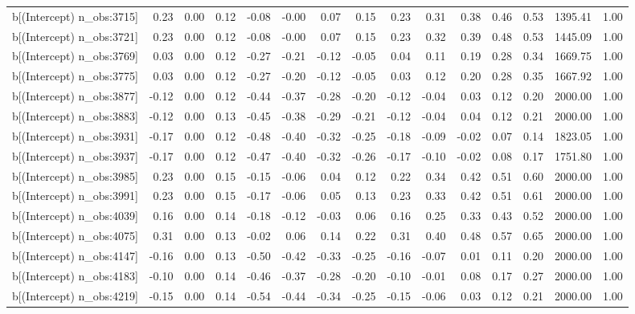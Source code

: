 \begin{table}[ht]
\begin{tabular}{rrrrrrrrrrrrrrr}
  b[(Intercept) n\_obs:3715] & 0.23 & 0.00 & 0.12 & -0.08 & -0.00 & 0.07 & 0.15 & 0.23 & 0.31 & 0.38 & 0.46 & 0.53 & 1395.41 & 1.00 \\ 
  b[(Intercept) n\_obs:3721] & 0.23 & 0.00 & 0.12 & -0.08 & -0.00 & 0.07 & 0.15 & 0.23 & 0.32 & 0.39 & 0.48 & 0.53 & 1445.09 & 1.00 \\ 
  b[(Intercept) n\_obs:3769] & 0.03 & 0.00 & 0.12 & -0.27 & -0.21 & -0.12 & -0.05 & 0.04 & 0.11 & 0.19 & 0.28 & 0.34 & 1669.75 & 1.00 \\ 
  b[(Intercept) n\_obs:3775] & 0.03 & 0.00 & 0.12 & -0.27 & -0.20 & -0.12 & -0.05 & 0.03 & 0.12 & 0.20 & 0.28 & 0.35 & 1667.92 & 1.00 \\ 
  b[(Intercept) n\_obs:3877] & -0.12 & 0.00 & 0.12 & -0.44 & -0.37 & -0.28 & -0.20 & -0.12 & -0.04 & 0.03 & 0.12 & 0.20 & 2000.00 & 1.00 \\ 
  b[(Intercept) n\_obs:3883] & -0.12 & 0.00 & 0.13 & -0.45 & -0.38 & -0.29 & -0.21 & -0.12 & -0.04 & 0.04 & 0.12 & 0.21 & 2000.00 & 1.00 \\ 
  b[(Intercept) n\_obs:3931] & -0.17 & 0.00 & 0.12 & -0.48 & -0.40 & -0.32 & -0.25 & -0.18 & -0.09 & -0.02 & 0.07 & 0.14 & 1823.05 & 1.00 \\ 
  b[(Intercept) n\_obs:3937] & -0.17 & 0.00 & 0.12 & -0.47 & -0.40 & -0.32 & -0.26 & -0.17 & -0.10 & -0.02 & 0.08 & 0.17 & 1751.80 & 1.00 \\ 
  b[(Intercept) n\_obs:3985] & 0.23 & 0.00 & 0.15 & -0.15 & -0.06 & 0.04 & 0.12 & 0.22 & 0.34 & 0.42 & 0.51 & 0.60 & 2000.00 & 1.00 \\ 
  b[(Intercept) n\_obs:3991] & 0.23 & 0.00 & 0.15 & -0.17 & -0.06 & 0.05 & 0.13 & 0.23 & 0.33 & 0.42 & 0.51 & 0.61 & 2000.00 & 1.00 \\ 
  b[(Intercept) n\_obs:4039] & 0.16 & 0.00 & 0.14 & -0.18 & -0.12 & -0.03 & 0.06 & 0.16 & 0.25 & 0.33 & 0.43 & 0.52 & 2000.00 & 1.00 \\ 
  b[(Intercept) n\_obs:4075] & 0.31 & 0.00 & 0.13 & -0.02 & 0.06 & 0.14 & 0.22 & 0.31 & 0.40 & 0.48 & 0.57 & 0.65 & 2000.00 & 1.00 \\ 
  b[(Intercept) n\_obs:4147] & -0.16 & 0.00 & 0.13 & -0.50 & -0.42 & -0.33 & -0.25 & -0.16 & -0.07 & 0.01 & 0.11 & 0.20 & 2000.00 & 1.00 \\ 
  b[(Intercept) n\_obs:4183] & -0.10 & 0.00 & 0.14 & -0.46 & -0.37 & -0.28 & -0.20 & -0.10 & -0.01 & 0.08 & 0.17 & 0.27 & 2000.00 & 1.00 \\ 
  b[(Intercept) n\_obs:4219] & -0.15 & 0.00 & 0.14 & -0.54 & -0.44 & -0.34 & -0.25 & -0.15 & -0.06 & 0.03 & 0.12 & 0.21 & 2000.00 & 1.00 \\ 

\end{tabular}
\end{table}
